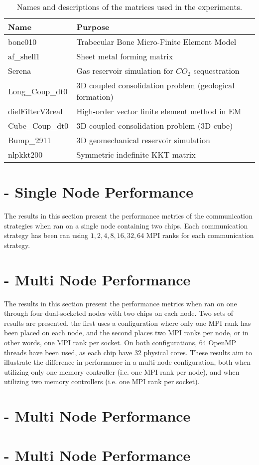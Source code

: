 \begin{table}[H]
\begin{center}
\begin{tabular}[c]{|l|l|}
\hline
\textbf{Name}&\textbf{Purpose}  \\
\hline
bone010&Trabecular Bone Micro-Finite Element Model\\
\hline
af\_shell1&Sheet metal forming matrix\\
\hline
Serena&Gas reservoir simulation for \(CO_{2}\) sequestration\\
\hline
Long\_Coup\_dt0&3D coupled consolidation problem (geological formation)\\
\hline
dielFilterV3real&High-order vector finite element method in EM\\
\hline
Cube\_Coup\_dt0&3D coupled consolidation problem (3D cube)\\
\hline
Bump\_2911&3D geomechanical reservoir simulation\\
\hline
nlpkkt200&Symmetric indefinite KKT matrix\\
\hline
\end{tabular}
\end{center}
\caption{Names and descriptions of the matrices used in the experiments.}
\label{tab:matricesused}
\end{table}

\section{ - Single Node Performance}
The results in this section present the performance metrics of the communication strategies when ran on a single node containing two  chips. Each communication strategy has been ran using \(1,2,4,8,16,32,64\) MPI ranks for each communication strategy.
\medskip



\section{ - Multi Node Performance}
The results in this section present the performance metrics when ran on one through four dual-socketed nodes with two  chips on each node. Two sets of results are presented, the first uses a configuration where only one MPI rank has been placed on each node, and the second places two MPI ranks per node, or in other words, one MPI rank per socket. On both configurations, 64 OpenMP threads have been used, as each chip have 32 physical cores. These results aim to illustrate the difference in performance in a multi-node configuration, both when utilizing only one memory controller (i.e. one MPI rank per node), and when utilizing two memory controllers (i.e. one MPI rank per socket). 
\medskip




\section{\romeq{} - Multi Node Performance}


\section{\fpgaq{} - Multi Node Performance}






